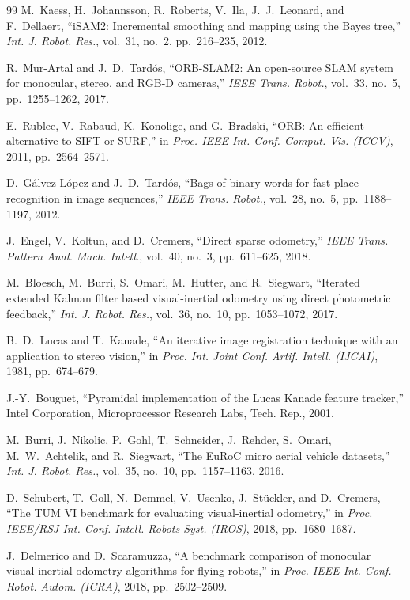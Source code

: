 \documentclass[conference,a4paper]{IEEEtran}
\begin{document}
\begin{thebibliography}{99}
M.~Kaess, H.~Johannsson, R.~Roberts, V.~Ila, J.~J.~Leonard, and F.~Dellaert,
``iSAM2: Incremental smoothing and mapping using the Bayes tree,''
\emph{Int. J. Robot. Res.}, vol.~31, no.~2, pp.~216--235, 2012.

R.~Mur-Artal and J.~D.~Tard\'os,
``ORB-SLAM2: An open-source SLAM system for monocular, stereo, and RGB-D cameras,''
\emph{IEEE Trans. Robot.}, vol.~33, no.~5, pp.~1255--1262, 2017.

E.~Rublee, V.~Rabaud, K.~Konolige, and G.~Bradski,
``ORB: An efficient alternative to SIFT or SURF,''
in \emph{Proc. IEEE Int. Conf. Comput. Vis. (ICCV)}, 2011, pp.~2564--2571.

D.~G\'alvez-L\'opez and J.~D.~Tard\'os,
``Bags of binary words for fast place recognition in image sequences,''
\emph{IEEE Trans. Robot.}, vol.~28, no.~5, pp.~1188--1197, 2012.

J.~Engel, V.~Koltun, and D.~Cremers, ``Direct sparse odometry,''
\emph{IEEE Trans. Pattern Anal. Mach. Intell.}, vol.~40, no.~3, pp.~611--625, 2018.

M.~Bloesch, M.~Burri, S.~Omari, M.~Hutter, and R.~Siegwart,
``Iterated extended Kalman filter based visual-inertial odometry using direct photometric
feedback,'' \emph{Int. J. Robot. Res.}, vol.~36, no.~10, pp.~1053--1072, 2017.

B.~D.~Lucas and T.~Kanade,
``An iterative image registration technique with an application to stereo vision,''
in \emph{Proc. Int. Joint Conf. Artif. Intell. (IJCAI)}, 1981, pp.~674--679.

J.-Y.~Bouguet, ``Pyramidal implementation of the Lucas Kanade feature tracker,''
Intel Corporation, Microprocessor Research Labs, Tech. Rep., 2001.

M.~Burri, J.~Nikolic, P.~Gohl, T.~Schneider, J.~Rehder, S.~Omari, M.~W.~Achtelik, and
R.~Siegwart, ``The EuRoC micro aerial vehicle datasets,''
\emph{Int. J. Robot. Res.}, vol.~35, no.~10, pp.~1157--1163, 2016.

D.~Schubert, T.~Goll, N.~Demmel, V.~Usenko, J.~St\"uckler, and D.~Cremers,
``The TUM VI benchmark for evaluating visual-inertial odometry,''
in \emph{Proc. IEEE/RSJ Int. Conf. Intell. Robots Syst. (IROS)}, 2018, pp.~1680--1687.

J.~Delmerico and D.~Scaramuzza,
``A benchmark comparison of monocular visual-inertial odometry algorithms for flying robots,''
in \emph{Proc. IEEE Int. Conf. Robot. Autom. (ICRA)}, 2018, pp.~2502--2509.


\end{thebibliography}
\end{document}
